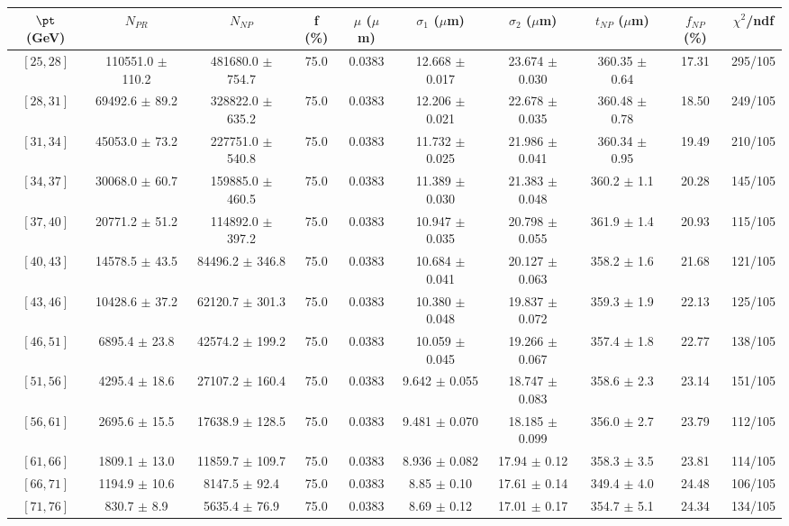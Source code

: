 \begin{tabular}{c||c|c|c|c|c|c|c||c|c}
$\pt$ (GeV) & $N_{PR}$ & $N_{NP}$ & f (\%) & $\mu$ ($\mu$m) & $\sigma_1$ ($\mu$m) & $\sigma_2$ ($\mu$m)  & $t_{NP}$ ($\mu$m) & $f_{NP}$ (\%) & $\chi^2$/ndf \\
\hline
$[25, 28]$ & 110551.0 $\pm$ 110.2 & 481680.0 $\pm$ 754.7 & 75.0 & 0.0383 & 12.668 $\pm$ 0.017 & 23.674 $\pm$ 0.030 & 360.35 $\pm$ 0.64 & 17.31 & 295/105\\
$[28, 31]$ & 69492.6 $\pm$ 89.2 & 328822.0 $\pm$ 635.2 & 75.0 & 0.0383 & 12.206 $\pm$ 0.021 & 22.678 $\pm$ 0.035 & 360.48 $\pm$ 0.78 & 18.50 & 249/105\\
$[31, 34]$ & 45053.0 $\pm$ 73.2 & 227751.0 $\pm$ 540.8 & 75.0 & 0.0383 & 11.732 $\pm$ 0.025 & 21.986 $\pm$ 0.041 & 360.34 $\pm$ 0.95 & 19.49 & 210/105\\
$[34, 37]$ & 30068.0 $\pm$ 60.7 & 159885.0 $\pm$ 460.5 & 75.0 & 0.0383 & 11.389 $\pm$ 0.030 & 21.383 $\pm$ 0.048 & 360.2 $\pm$ 1.1 & 20.28 & 145/105\\
$[37, 40]$ & 20771.2 $\pm$ 51.2 & 114892.0 $\pm$ 397.2 & 75.0 & 0.0383 & 10.947 $\pm$ 0.035 & 20.798 $\pm$ 0.055 & 361.9 $\pm$ 1.4 & 20.93 & 115/105\\
$[40, 43]$ & 14578.5 $\pm$ 43.5 & 84496.2 $\pm$ 346.8 & 75.0 & 0.0383 & 10.684 $\pm$ 0.041 & 20.127 $\pm$ 0.063 & 358.2 $\pm$ 1.6 & 21.68 & 121/105\\
$[43, 46]$ & 10428.6 $\pm$ 37.2 & 62120.7 $\pm$ 301.3 & 75.0 & 0.0383 & 10.380 $\pm$ 0.048 & 19.837 $\pm$ 0.072 & 359.3 $\pm$ 1.9 & 22.13 & 125/105\\
$[46, 51]$ & 6895.4 $\pm$ 23.8 & 42574.2 $\pm$ 199.2 & 75.0 & 0.0383 & 10.059 $\pm$ 0.045 & 19.266 $\pm$ 0.067 & 357.4 $\pm$ 1.8 & 22.77 & 138/105\\
$[51, 56]$ & 4295.4 $\pm$ 18.6 & 27107.2 $\pm$ 160.4 & 75.0 & 0.0383 & 9.642 $\pm$ 0.055 & 18.747 $\pm$ 0.083 & 358.6 $\pm$ 2.3 & 23.14 & 151/105\\
$[56, 61]$ & 2695.6 $\pm$ 15.5 & 17638.9 $\pm$ 128.5 & 75.0 & 0.0383 & 9.481 $\pm$ 0.070 & 18.185 $\pm$ 0.099 & 356.0 $\pm$ 2.7 & 23.79 & 112/105\\
$[61, 66]$ & 1809.1 $\pm$ 13.0 & 11859.7 $\pm$ 109.7 & 75.0 & 0.0383 & 8.936 $\pm$ 0.082 & 17.94 $\pm$ 0.12 & 358.3 $\pm$ 3.5 & 23.81 & 114/105\\
$[66, 71]$ & 1194.9 $\pm$ 10.6 & 8147.5 $\pm$ 92.4 & 75.0 & 0.0383 & 8.85 $\pm$ 0.10 & 17.61 $\pm$ 0.14 & 349.4 $\pm$ 4.0 & 24.48 & 106/105\\
$[71, 76]$ & 830.7 $\pm$ 8.9 & 5635.4 $\pm$ 76.9 & 75.0 & 0.0383 & 8.69 $\pm$ 0.12 & 17.01 $\pm$ 0.17 & 354.7 $\pm$ 5.1 & 24.34 & 134/105\\

\end{tabular}
